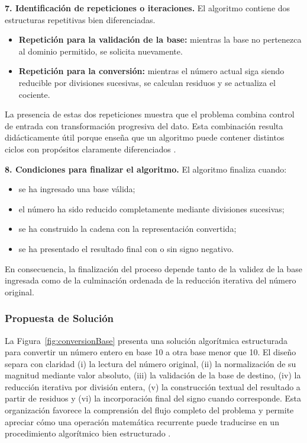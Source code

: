 \documentclass[12pt,twoside]{book}
\begin{document}
					\noindent
					\textbf{7. Identificación de repeticiones o iteraciones.}
					El algoritmo contiene dos estructuras repetitivas bien diferenciadas.
					
					\begin{itemize}
						\item \textbf{Repetición para la validación de la base:} mientras la base no pertenezca al dominio permitido, se solicita nuevamente.
						\item \textbf{Repetición para la conversión:} mientras el número actual siga siendo reducible por divisiones sucesivas, se calculan residuos y se actualiza el cociente.
					\end{itemize}
					
					\noindent
					La presencia de estas dos repeticiones muestra que el problema combina control de entrada con transformación progresiva del dato. Esta combinación resulta didácticamente útil porque enseña que un algoritmo puede contener distintos ciclos con propósitos claramente diferenciados \cite{Qian2018Students,Lister2004Learning,Robins2003Learning}.
					
					\noindent
					\textbf{8. Condiciones para finalizar el algoritmo.}
					El algoritmo finaliza cuando:
					
					\begin{itemize}
						\item se ha ingresado una base válida;
						\item el número ha sido reducido completamente mediante divisiones sucesivas;
						\item se ha construido la cadena con la representación convertida;
						\item se ha presentado el resultado final con o sin signo negativo.
					\end{itemize}
					
					\noindent
					En consecuencia, la finalización del proceso depende tanto de la validez de la base ingresada como de la culminación ordenada de la reducción iterativa del número original.
					
				\subsubsection{Propuesta de Solución}
					\noindent
					La Figura~\ref{fig:conversionBase} presenta una solución algorítmica estructurada para convertir un número entero en base 10 a otra base menor que 10. El diseño separa con claridad (i) la lectura del número original, (ii) la normalización de su magnitud mediante valor absoluto, (iii) la validación de la base de destino, (iv) la reducción iterativa por división entera, (v) la construcción textual del resultado a partir de residuos y (vi) la incorporación final del signo cuando corresponde. Esta organización favorece la comprensión del flujo completo del problema y permite apreciar cómo una operación matemática recurrente puede traducirse en un procedimiento algorítmico bien estructurado \cite{Hooshyar2015Flowchart,Farrell2018Programming}.
					
\end{document}
